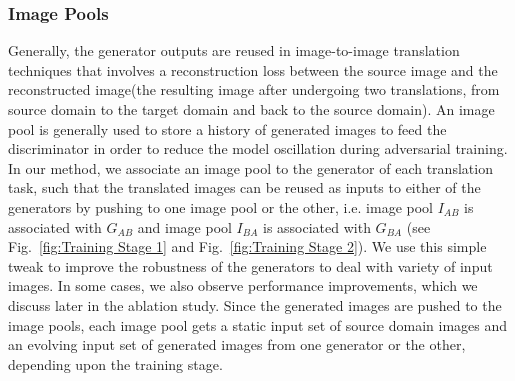 \documentclass[a4paper,twoside]{article}
\begin{document}
\subsubsection{Image Pools}
\label{Image Pools}
Generally, the generator outputs are reused in image-to-image translation techniques that involves a reconstruction loss between the source image and the reconstructed image(the resulting image after undergoing two translations, from source domain to the target domain and back to the source domain). An image pool \cite{DBLP:journals/corr/ShrivastavaPTSW16} is generally used to store a history of generated images to feed the discriminator in order to reduce the model oscillation during adversarial training. In our method, we associate an image pool to the generator of each translation task, such that the translated images can be reused as inputs to either of the generators by pushing to one image pool or the other, i.e. image pool $I_{AB}$ is associated with $G_{AB}$ and image pool $I_{BA}$ is associated with $G_{BA}$ (see Fig.~\ref{fig:Training Stage 1} and Fig.~\ref{fig:Training Stage 2}). We use this simple tweak to improve the robustness of the generators to deal with variety of input images. In some cases, we also observe performance improvements, which we discuss later in the ablation study. Since the generated images are pushed to the image pools, each image pool gets a static input set of source domain images and an evolving input set of generated images from one generator or the other, depending upon the training stage.
\end{document}
